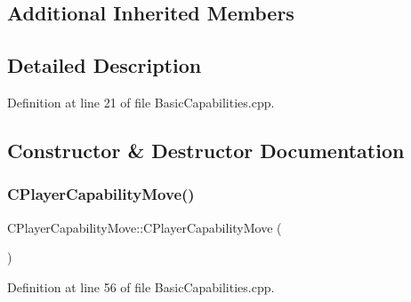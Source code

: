 \subsection*{Additional Inherited Members}


\subsection{Detailed Description}


Definition at line 21 of file Basic\+Capabilities.\+cpp.



\subsection{Constructor \& Destructor Documentation}
\hypertarget{classCPlayerCapabilityMove_a6bfe72663b6b5fc708d23373dc293ec7}{}\label{classCPlayerCapabilityMove_a6bfe72663b6b5fc708d23373dc293ec7} 
\subsubsection{\texorpdfstring{C\+Player\+Capability\+Move()}{CPlayerCapabilityMove()}}
{\footnotesize\ttfamily C\+Player\+Capability\+Move\+::\+C\+Player\+Capability\+Move (\begin{DoxyParamCaption}{ }\end{DoxyParamCaption})\hspace{0.3cm}{\ttfamily [protected]}}



Definition at line 56 of file Basic\+Capabilities.\+cpp.


